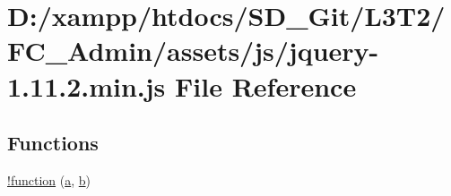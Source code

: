 \hypertarget{assets_2js_2jquery-1_811_82_8min_8js}{}\section{D\+:/xampp/htdocs/\+S\+D\+\_\+\+Git/\+L3\+T2/\+F\+C\+\_\+\+Admin/assets/js/jquery-\/1.11.2.min.\+js File Reference}
\label{assets_2js_2jquery-1_811_82_8min_8js}
\subsection*{Functions}
\begin{DoxyCompactItemize}
\item 
\hyperlink{assets_2js_2jquery-1_811_82_8min_8js_a43f0b96ea8ec44ca20ba86809a785614}{!function} (\hyperlink{assets_2js_2bootstrap_8min_8js_a1f5870dcf487187f13d5fd328ed9e6e7}{a}, \hyperlink{assets_2js_2bootstrap_8min_8js_a398bb8542498d1b14178b02b99df309b}{b})
\item 

\end{DoxyCompactItemize}
